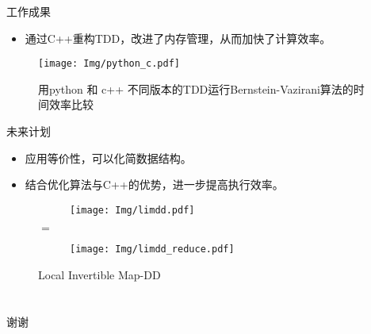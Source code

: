\documentclass[aspectratio=1610]{ctexbeamer}
\begin{document}
\begin{frame}{工作成果}
    \begin{itemize}[label=$\bullet$]
        \item 通过C++重构TDD，改进了内存管理，从而加快了计算效率。
    \end{itemize}
    \begin{figure}
        \texttt{[image: Img/python\_c.pdf]}
        \caption{用python 和 c++ 不同版本的TDD运行Bernstein-Vazirani算法的时间效率比较}
    \end{figure}
\end{frame}
\begin{frame}{未来计划}
    \begin{itemize}[label=$\bullet$]
        \item 应用等价性，可以化简数据结构。
        \item 结合优化算法与C++的优势，进一步提高执行效率。
    \end{itemize}
    \begin{figure}
    \centering
    \begin{subfigure}{0.4\textwidth}
        \centering
        \texttt{[image: Img/limdd.pdf]}
    \end{subfigure}
    \hspace{1em} %
    \Large$=$
    \hspace{1em} %
    \begin{subfigure}{0.4\textwidth}
        \centering
        \texttt{[image: Img/limdd\_reduce.pdf]}
    \end{subfigure}
    \caption{Local Invertible Map-DD}
\end{figure}

\end{frame}

\section*{}
\begin{frame}
    \centering
    \Huge 谢谢
\end{frame}
\end{document}
